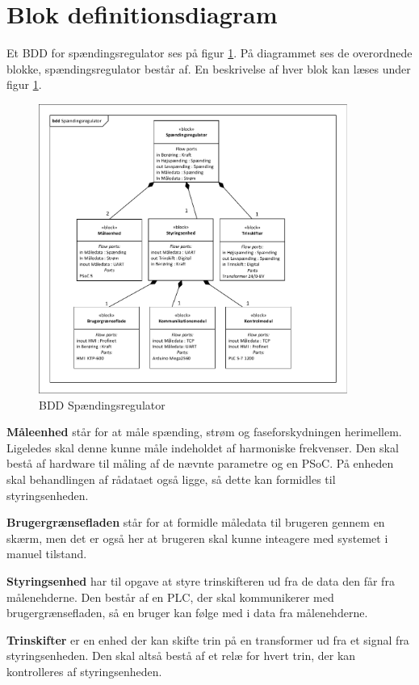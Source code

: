 
\section{Blok definitionsdiagram}
Et BDD for spændingsregulator ses på figur \ref{fig:BDDSpaendingsregulator}. På diagrammet ses de overordnede blokke, spændingsregulator består af. En beskrivelse af hver blok kan læses under figur \ref{fig:BDDSpaendingsregulator}.

\begin{figure}[htbp] %
	\centering
	\includegraphics[width=0.9\textwidth]{Figure/BDDSpaendingsregulator}
	\caption{BDD Spændingsregulator}
	\label{fig:BDDSpaendingsregulator}
\end{figure}

\textbf{Måleenhed} står for at måle spænding, strøm og faseforskydningen herimellem. Ligeledes skal denne kunne måle indeholdet af harmoniske frekvenser. Den skal bestå af hardware til måling af de nævnte parametre og en PSoC. På enheden skal behandlingen af rådataet også ligge, så dette kan formidles til styringsenheden.


\textbf{Brugergrænsefladen} står for at formidle måledata til brugeren gennem en skærm, men det er også her at brugeren skal kunne inteagere med systemet i manuel tilstand.



\textbf{Styringsenhed} har til opgave at styre trinskifteren ud fra de data den får fra målenehderne. Den består af en PLC, der skal kommunikerer med brugergrænsefladen, så en bruger kan følge med i data fra målenehderne.

\textbf{Trinskifter} er en enhed der kan skifte trin på en transformer ud fra et signal fra styringsenheden. Den skal altså bestå af et relæ for hvert trin, der kan kontrolleres af styringsenheden.